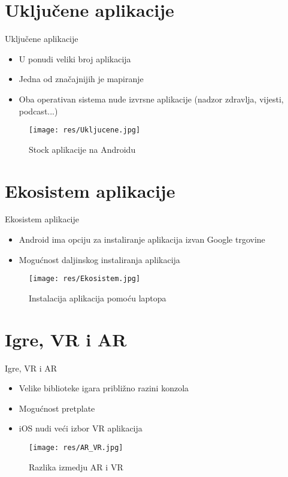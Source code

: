\documentclass{beamer}
\begin{document}
\section{Uključene aplikacije}
\begin{frame}{Uključene aplikacije}
\begin{itemize}
\item U ponudi veliki broj aplikacija
\item Jedna od značajnijih je mapiranje
\item Oba operativan sistema nude izvrsne aplikacije (nadzor zdravlja, vijesti, podcast...)
\end{itemize}
\begin{figure}[h]
\centering
\captionsetup{}
\texttt{[image: res/Ukljucene.jpg]}
\caption{Stock aplikacije na Androidu}
\end{figure}
\end{frame}
\section{Ekosistem aplikacije}
\begin{frame}{Ekosistem aplikacije}
\begin{itemize}
\item Android ima opciju za instaliranje aplikacija izvan Google trgovine
\item Mogućnost daljinskog instaliranja aplikacija
\end{itemize}
\begin{figure}[h]
\centering
\captionsetup{}
\texttt{[image: res/Ekosistem.jpg]}
\caption{Instalacija aplikacija pomoću laptopa}
\end{figure}
\end{frame}
\section{Igre, VR i AR}
\begin{frame}{Igre, VR i AR}
\begin{itemize}
\item Velike biblioteke igara približno razini konzola
\item Mogućnost pretplate
\item iOS nudi veći izbor VR aplikacija
\end{itemize}
\begin{figure}[h]
\centering
\captionsetup{}
\texttt{[image: res/AR\_VR.jpg]}
\caption{Razlika izmedju AR i VR}
\end{figure}
\end{frame}
\end{document}

